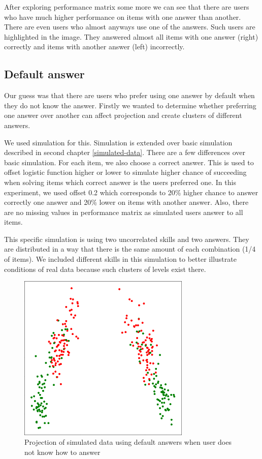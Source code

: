 \documentclass[
  digital, %
  table,   %
  nolof,     %
  nolot,     %
  nocover,
  color
]{fithesis3}
\begin{document}
After exploring performance matrix some more we can see that there are users who have much higher performance on items with one answer than another. There are even users who almost anyways use one of the answers. Such users are highlighted in the image. They answered almost all items with one answer (right) correctly and items with another answer (left) incorrectly.


\subsection{Default answer}\label{default-answer}

Our guess was that there are users who prefer using one answer by default when they do not know the answer. Firstly we wanted to determine whether preferring one answer over another can affect projection and create clusters of different answers.

We used simulation for this. Simulation is extended over basic simulation described in second chapter \ref{simulated-data}. There are a few differences over basic simulation. For each item, we also choose a correct answer. This is used to offset logistic function higher or lower to simulate higher chance of succeeding when solving items which correct answer is the users preferred one. In this experiment, we used offset 0.2 which corresponds to 20\% higher chance to answer correctly one answer and 20\% lower on items with another answer. Also, there are no missing values in performance matrix as simulated users answer to all items.

This specific simulation is using two uncorrelated skills and two answers. They are distributed in a way that there is the same amount of each combination (1/4 of items). We included different skills in this simulation to better illustrate conditions of real data because such clusters of levels exist there.

\begin{figure}
  \includegraphics[height=8cm]{img/simulated_default}
  \caption{Projection of simulated data using default answers when user does not know how to answer}
  \label{fig:simulated_default}
\end{figure}
\end{document}
